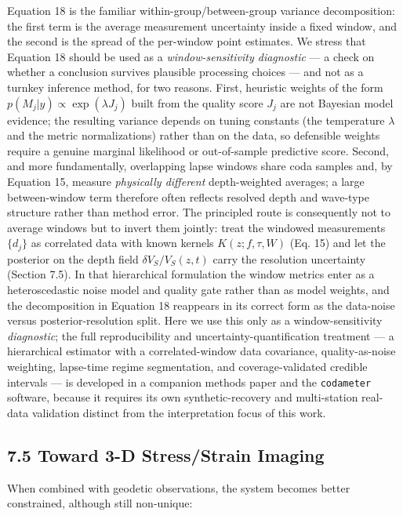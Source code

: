 \documentclass[12pt]{article}
\begin{document}
Equation 18 is the familiar within-group/between-group variance
decomposition: the first term is the average measurement uncertainty
inside a fixed window, and the second is the spread of the per-window
point estimates. We stress that Equation 18 should be used as a
\emph{window-sensitivity diagnostic} --- a check on whether a conclusion
survives plausible processing choices --- and not as a turnkey inference
method, for two reasons. First, heuristic weights of the form
\(p(M_j|y)\propto\exp(\lambda J_j)\) built from the quality score
\(J_j\) are not Bayesian model evidence; the resulting variance depends
on tuning constants (the temperature \(\lambda\) and the metric
normalizations) rather than on the data, so defensible weights require a
genuine marginal likelihood or out-of-sample predictive score. Second,
and more fundamentally, overlapping lapse windows share coda samples
and, by Equation 15, measure \emph{physically different} depth-weighted
averages; a large between-window term therefore often reflects resolved
depth and wave-type structure rather than method error. The principled
route is consequently not to average windows but to invert them jointly:
treat the windowed measurements \(\{d_j\}\) as correlated data with
known kernels \(K(z;f,\tau,W)\) (Eq. 15) and let the posterior on the
depth field \(\delta V_S/V_S(z,t)\) carry the resolution uncertainty
(Section 7.5). In that hierarchical formulation the window metrics enter
as a heteroscedastic noise model and quality gate rather than as model
weights, and the decomposition in Equation 18 reappears in its correct
form as the data-noise versus posterior-resolution split. Here we use
this only as a window-sensitivity \emph{diagnostic}; the full
reproducibility and uncertainty-quantification treatment --- a
hierarchical estimator with a correlated-window data covariance,
quality-as-noise weighting, lapse-time regime segmentation, and
coverage-validated credible intervals --- is developed in a companion
methods paper and the \texttt{codameter} software, because it requires
its own synthetic-recovery and multi-station real-data validation
distinct from the interpretation focus of this work.

\subsection{7.5 Toward 3-D Stress/Strain
Imaging}\label{toward-3-d-stressstrain-imaging}

When combined with geodetic observations, the system becomes better
constrained, although still non-unique:
\end{document}
